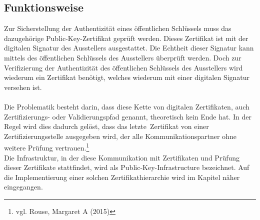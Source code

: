 \subsection{Funktionsweise}
Zur Sicherstellung der Authentizität eines öffentlichen Schlüssels muss das dazugehörige Public-Key-Zertifikat geprüft werden. Dieses Zertifikat ist mit der digitalen Signatur des Ausstellers ausgestattet. Die Echtheit dieser Signatur kann mittels des öffentlichen Schlüssels des Ausstellers überprüft werden. Doch zur Verifizierung der Authentizität des öffentlichen Schlüssels des Ausstellers wird wiederum ein Zertifikat benötigt, welches wiederum mit einer digitalen Signatur versehen ist.\\
\\
Die Problematik besteht darin, dass diese Kette von digitalen Zertifikaten, auch Zertifizierungs- oder Validierungspfad genannt, theoretisch kein Ende hat. In der Regel wird dies dadurch gelöst, dass das \glqq letzte\grqq~Zertifikat von einer Zertifizierungsstelle ausgegeben wird, der alle Kommunikationspartner ohne weitere Prüfung vertrauen.\footnote{vgl. Rouse, Margaret A (2015)}\\
Die Infrastruktur, in der diese Kommunikation mit Zertifikaten und Prüfung dieser Zertifikate stattfindet, wird als Public-Key-Infrastructure bezeichnet.
Auf die Implementierung einer solchen Zertifikathierarchie wird im Kapitel \textit{} näher eingegangen.
